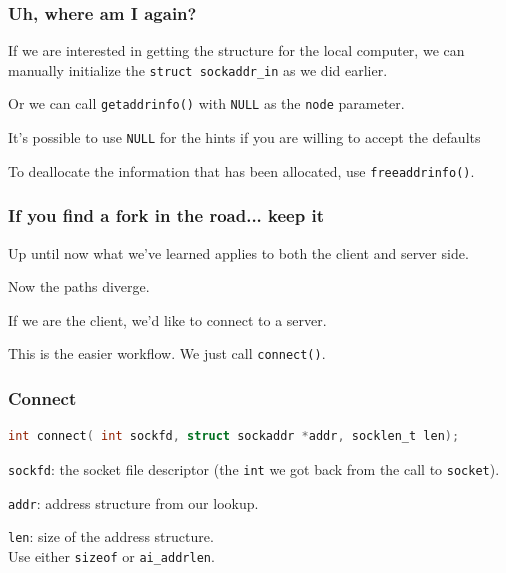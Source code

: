 \begin{frame}
\frametitle{Uh, where am I again?}

If we are interested in getting the structure for the local computer, we can manually initialize the \texttt{struct sockaddr\_in} as we did earlier.

Or we can call \texttt{getaddrinfo()} with \texttt{NULL} as the \texttt{node} parameter.

It's possible to use \texttt{NULL} for the hints if you are willing to accept the defaults 

To deallocate the information that has been allocated, use \texttt{freeaddrinfo()}.
\end{frame}


\begin{frame}
\frametitle{If you find a fork in the road... keep it}

Up until now what we've learned applies to both the client and server side. 

Now the paths diverge.

If we are the client, we'd like to connect to a server. 

This is the easier workflow. We just call \texttt{connect()}.

\end{frame}


\begin{frame}[fragile]
\frametitle{Connect}

\begin{lstlisting}[language=C]
int connect( int sockfd, struct sockaddr *addr, socklen_t len); 
\end{lstlisting}

\texttt{sockfd}: the socket file descriptor (the \texttt{int} we got back from the call to \texttt{socket}).

\texttt{addr}: address structure from our lookup.

\texttt{len}: size of the address structure. \\
\quad Use either \texttt{sizeof} or \texttt{ai\_addrlen}.

\end{frame}


